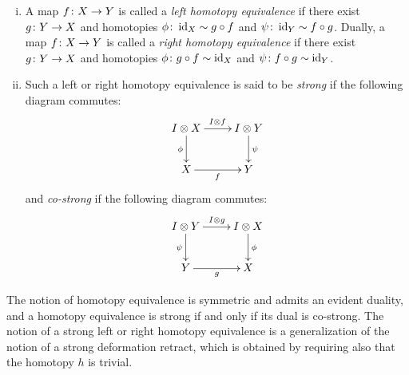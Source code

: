 \documentclass[reqno,10pt,a4paper,oneside,draft]{amsart}
\begin{document}
\begin{definition} \hfill
\begin{enumerate}[(i)]
\item A map $f \colon X \to Y$ is called a \emph{left homotopy equivalence} if there exist $g \colon Y \to X$ and homotopies $\phi \colon \operatorname{id}_X \sim g \mathbin{\circ} f$ and $\psi \colon \operatorname{id}_Y \sim f \mathbin{\circ} g$.
Dually, a map $f \colon X \to Y$ is called a \emph{right homotopy equivalence} if there exist $g \colon Y \to X$ and homotopies $\phi \colon g \mathbin{\circ} f \sim \operatorname{id}_X $ and $\psi \colon f \mathbin{\circ} g \sim \operatorname{id}_Y$.
\item Such a left or right homotopy equivalence is said to be \emph{strong} if the following diagram commutes:
\[
\xymatrix{
  \interval \otimes X \ar[r]^{\interval \otimes f } \ar[d]_{\phi} & \interval \otimes Y \ar[d]^{\psi} \\
  X \ar[r]_{f} & Y
}
\]
and \emph{co-strong} if the following diagram commutes:
\[
  \xymatrix{
  \interval \otimes Y \ar[r]^{\interval \otimes g } \ar[d]_{\psi} & \interval \otimes X \ar[d]^{\phi} \\
  Y \ar[r]_{g} & X
}
\]
\end{enumerate}
\end{definition}

The notion of homotopy equivalence is symmetric and admits an evident duality, and a homotopy equivalence is strong if and only if its dual is co-strong.
The notion of a strong left or right homotopy equivalence is a generalization of the notion of a strong deformation retract, which is obtained by requiring also that the homotopy $h$ is trivial.

\medskip
\end{document}
